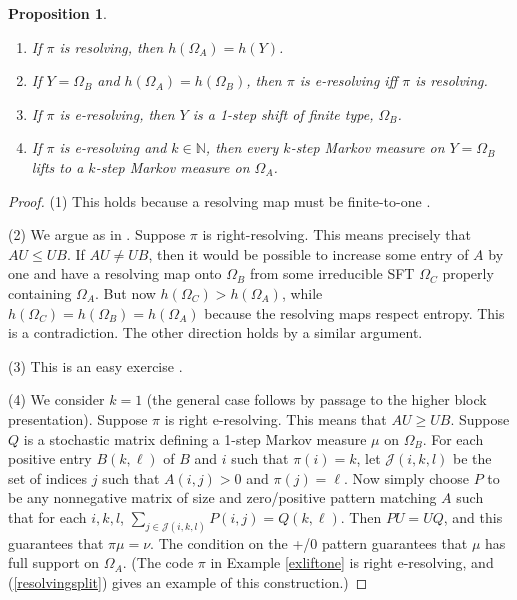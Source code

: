 \documentclass{kepart2010}
\theoremstyle{plain}
\newtheorem{prop}[thm]{Proposition}
\theoremstyle{definition}
\theoremstyle{remark}
\theoremstyle{definition}
\numberwithin{equation}{section}
\begin{document}
\begin{prop}\label{resolvingprop}
\begin{enumerate}
\item
If $\pi$ is resolving, then $h(\Omega_A)=h(Y)$.
\item
If $Y=\Omega_B$ and $h(\Omega_A) =h(\Omega_B)$, then $\pi$ is
e-resolving iff $\pi$ is resolving.
\item
If $\pi$ is e-resolving, then $Y$ is a 1-step shift of finite type,
$\Omega_B$.
\item If $\pi$ is e-resolving and $k\in \mathbb N$,
then every $k$-step Markov measure on $Y=\Omega_B$ lifts to a
$k$-step Markov measure on $\Omega_A$.
\end{enumerate}
\end{prop}
\begin{proof}
(1) This holds because a resolving map must be finite-to-one
\cite{LindMarcus1995,Kitchens1998}.

(2) We argue as in \cite{LindMarcus1995,Kitchens1998}. Suppose $\pi$
is right-resolving. This means precisely
 that $AU\leq UB$. If $AU \neq UB$, then it would be possible
to increase some entry of $A$ by one and have a resolving
map onto $\Omega_B$ from some irreducible SFT
$\Omega_C$ properly containing $\Omega_A$. But now
$h(\Omega_C)>h(\Omega_A)$, while
$h(\Omega_C)=h(\Omega_B)=h(\Omega_A)$ because the resolving
maps respect entropy. This is a contradiction. The other direction
holds by a similar argument.

(3) This is an easy exercise \cite{BoyleTuncel1984}.

(4) We consider $k=1$ (the general case follows by passage to the
higher block presentation). Suppose $\pi$ is right e-resolving. This
means that $AU \geq UB$. Suppose $Q$ is a stochastic matrix defining
a 1-step Markov measure $\mu$ on $\Omega_B$. For each positive entry
$B(k,\ell )$ of $B$ and $i$ such that $\pi (i)=k$, let $\mathcal
J(i,k,l)$ be the set of indices $j$ such that $A(i,j)>0$ and $\pi
(j)=\ell$. Now simply choose $P$
to be
 any nonnegative matrix of size and zero/positive pattern
matching $A$ such that for each
 $i,k,l$, $\sum_{{j\in \mathcal J(i,k,l)}} P(i,j)
=Q(k,\ell )$.
 Then $PU=UQ$, and this guarantees that $\pi \mu = \nu$.
The condition on {the} +/0 pattern guarantees that $\mu$ has full
support on $\Omega_A$. (The code $\pi$ in Example \ref{exliftone} is
right e-resolving, and (\ref{resolvingsplit}) gives an example of this
construction.)
\end{proof}
\end{document}
